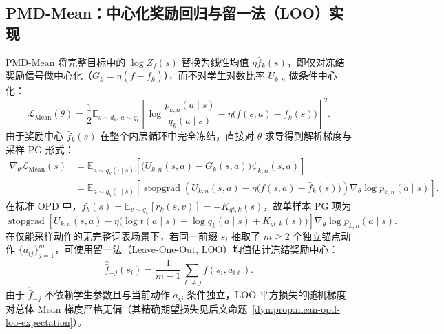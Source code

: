 \documentclass[lang=cn,scheme=chinese,openany]{elegantbook}
\newcommand{\sg}{\operatorname{stopgrad}}
\begin{document}
\subsection{PMD-Mean：中心化奖励回归与留一法（LOO）实现}
\label{sec:ch2-pmd-mean}

PMD-Mean 将完整目标中的 $\log Z_f(s)$ 替换为线性均值 $\eta\bar f_k(s)$，即仅对冻结奖励信号做中心化（$G_k=\eta(f-\bar f_k)$），而不对学生对数比率 $U_{k,n}$ 做条件中心化：
\begin{equation}
\mathcal L_{\mathrm{Mean}}(\theta)
=\frac12\mathbb E_{s\sim d_k,\, a\sim q_k}
\left[\log\frac{ p_{k,n}(a\mid s)}{ q_k(a\mid s)}
-\eta\bigl(f(s,a)-\bar f_k(s)\bigr)\right]^2.
\label{eq:ch2-mean-loss-bridge}
\end{equation}
由于奖励中心 $\bar f_k(s)$ 在整个内层循环中完全冻结，直接对 $\theta$ 求导得到解析梯度与采样 PG 形式：
\begin{align}
\nabla_\theta\mathcal L_{\mathrm{Mean}}(s)
&=\mathbb E_{a\sim q_k(\cdot\mid s)}
\left[\bigl(U_{k,n}(s,a)-G_k(s,a)\bigr)\psi_{k,n}(s,a)\right]\nonumber\\
&=\mathbb E_{a\sim q_k(\cdot\mid s)}\left[
\sg\!\left(U_{k,n}(s,a)-\eta\bigl(f(s,a)-\bar f_k(s)\bigr)\right)
\nabla_\theta\log p_{k,n}(a\mid s)\right].
\label{eq:ch2-mean-gradient-bridge,eq:ch2-mean-pg}
\end{align}
在标准 OPD 中，$\bar f_k(s)=\mathbb E_{v\sim q_k}[r_k(s,v)]=-K_{qt,k}(s)$，故单样本 PG 项为
\begin{equation}
\label{eq:ch2-mean-opd-pg}
\sg\!\left[
U_{k,n}(s,a)-\eta\bigl(\log t(a\mid s)-\log q_k(a\mid s)
+K_{qt,k}(s)\bigr)
\right]\nabla_\theta\log p_{k,n}(a\mid s).
\end{equation}
在仅能采样动作的无完整词表场景下，若同一前缀 $s_i$ 抽取了 $m\ge 2$ 个独立锚点动作 $\{a_{ij}\}_{j=1}^m$，可使用留一法（Leave-One-Out, LOO）均值估计冻结奖励中心：
\begin{equation*}
\widehat{\bar f}_{-j}(s_i)=\frac1{m-1}\sum_{\ell\ne j}f(s_i,a_{i\ell}).
\end{equation*}
由于 $\widehat{\bar f}_{-j}$ 不依赖学生参数且与当前动作 $a_{ij}$ 条件独立，LOO 平方损失的随机梯度对总体 Mean 梯度严格无偏（其精确期望损失见后文命题~\ref{dyn:prop:mean-opd-loo-expectation}）。
\end{document}
